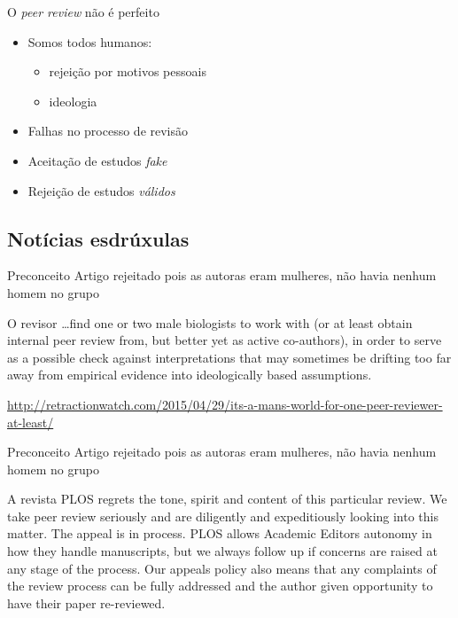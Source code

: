 \documentclass{beamer}
\begin{document}
\begin{frame}{O {\em peer review} não é perfeito}
  \begin{itemize}
  \item Somos todos humanos:
    \begin{itemize}
    \item rejeição por motivos pessoais
    \item ideologia
    \end{itemize}
  \item Falhas no processo de revisão
  \item Aceitação de estudos {\em fake}
  \item Rejeição de estudos {\em válidos}
  \end{itemize}
\end{frame}

\subsection{Notícias esdrúxulas}

\begin{frame}{Preconceito}
  Artigo rejeitado pois as autoras eram mulheres, não havia nenhum
  homem no grupo
    \begin{block}{O revisor}
      \ldots find one or two male biologists to work with (or at least
      obtain internal peer review from, but better yet as active
      co-authors), in order to serve as a possible check against
      interpretations that may sometimes be drifting too far away from
      empirical evidence into ideologically based assumptions.
    \end{block}

\url{http://retractionwatch.com/2015/04/29/its-a-mans-world-for-one-peer-reviewer-at-least/}
\end{frame}

\begin{frame}{Preconceito}
  Artigo rejeitado pois as autoras eram mulheres, não havia nenhum
  homem no grupo
    \begin{block}{A revista}
      PLOS regrets the tone, spirit and content of this particular
      review. We take peer review seriously and are diligently and
      expeditiously looking into this matter. The appeal is in
      process. PLOS allows Academic Editors autonomy in how they
      handle manuscripts, but we always follow up if concerns are
      raised at any stage of the process. Our appeals policy also
      means that any complaints of the review process can be fully
      addressed and the author given opportunity to have their paper
      re-reviewed.
    \end{block}
\end{frame}
\end{document}
